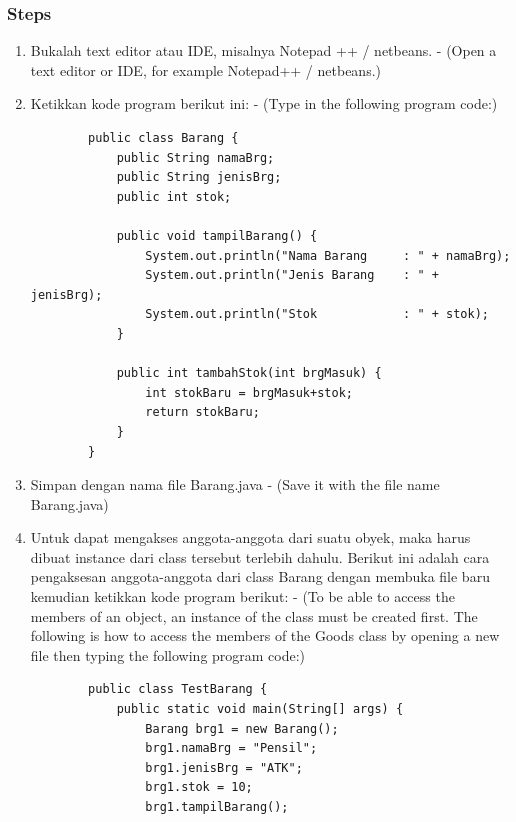 \documentclass[12pt,titlepage]{article}
\begin{document}
\subsubsection*{Steps}
\begin{enumerate}
    \item Bukalah text editor atau IDE, misalnya Notepad ++ / netbeans. - (Open a text editor or IDE, for example Notepad++ / netbeans.)
    \item Ketikkan kode program berikut ini: - (Type in the following program code:)
    \begin{verbatim}
        public class Barang {
            public String namaBrg;
            public String jenisBrg;
            public int stok;

            public void tampilBarang() {
                System.out.println("Nama Barang     : " + namaBrg);
                System.out.println("Jenis Barang    : " + jenisBrg);
                System.out.println("Stok            : " + stok);
            }

            public int tambahStok(int brgMasuk) {
                int stokBaru = brgMasuk+stok;
                return stokBaru;
            }
        }
    \end{verbatim}
    \item Simpan dengan nama file Barang.java - (Save it with the file name Barang.java)
    \item Untuk dapat mengakses anggota-anggota dari suatu obyek, maka harus dibuat instance dari class tersebut terlebih dahulu. Berikut ini adalah cara pengaksesan anggota-anggota dari class Barang dengan membuka file baru kemudian ketikkan kode program berikut: - (To be able to access the members of an object, an instance of the class must be created first. The following is how to access the members of the Goods class by opening a new file then typing the following program code:)
    \begin{verbatim}
        public class TestBarang {
            public static void main(String[] args) {
                Barang brg1 = new Barang();
                brg1.namaBrg = "Pensil";
                brg1.jenisBrg = "ATK";
                brg1.stok = 10;
                brg1.tampilBarang();


\end{verbatim}
\end{enumerate}
\end{document}
